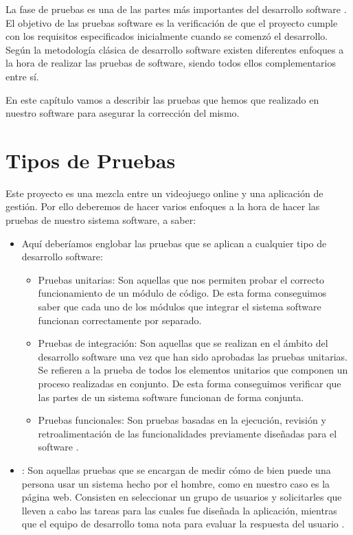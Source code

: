 

La fase de pruebas es una de las partes más importantes del desarrollo software
\cite{test:myers}. El objetivo de las pruebas software es la verificación de que
el proyecto cumple con los requisitos especificados inicialmente cuando se
comenzó el desarrollo. Según la metodología clásica de desarrollo software
existen diferentes enfoques a la hora de realizar las pruebas de software,
siendo todos ellos complementarios entre sí.

En este capítulo vamos a describir las pruebas que hemos que realizado en
nuestro software para asegurar la corrección del mismo.

\section{Tipos de Pruebas}
Este proyecto es una mezcla entre un videojuego online y una aplicación de
gestión. Por ello deberemos de hacer varios enfoques a la hora de hacer las
pruebas de nuestro sistema software, a saber:

\begin{itemize}
\item {} Aquí deberíamos englobar las pruebas que se
  aplican a cualquier tipo de desarrollo software:
  \begin{itemize}
  \item Pruebas unitarias: Son aquellas que nos permiten probar el correcto
    funcionamiento de un módulo de código. De esta forma conseguimos saber que
    cada uno de los módulos que integrar el sistema software funcionan
    correctamente por separado. \cite{test:unitaria}
  \item Pruebas de integración: Son aquellas que se realizan en el ámbito del
    desarrollo software una vez que han sido aprobadas las pruebas unitarias. Se
    refieren a la prueba de todos los elementos unitarios que componen un
    proceso realizadas en conjunto. De esta forma conseguimos verificar que las
    partes de un sistema software funcionan de forma conjunta. \cite{test:integracion}
  \item Pruebas funcionales: Son pruebas basadas en la ejecución, revisión y
    retroalimentación de las funcionalidades previamente diseñadas para el
    software \cite{test:funcionales}.
  \end{itemize}
\item {}: Son aquellas pruebas que se encargan de
  medir cómo de bien puede una persona usar un sistema hecho por el hombre, como
  en nuestro caso es la página web. Consisten en seleccionar un grupo de
  usuarios y solicitarles que lleven a cabo las tareas para las cuales fue
  diseñada la aplicación, mientras que el equipo de desarrollo toma nota para
  evaluar la respuesta del usuario \cite{test:usability}.
\end{itemize}

